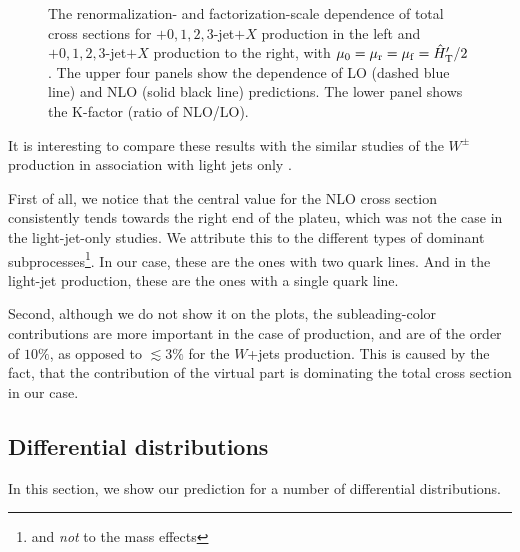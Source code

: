 \begin{figure}[t]
\begin{center}
\end{center}
\caption{The renormalization- and factorization-scale dependence of total cross
  sections for \Wbbm$+0,1,2,3$-jet$+X$ production in the left and
\Wbbp$+0,1,2,3$-jet$+X$ production to the right,
 with $\mu_0=\mu_\mathrm{r}=\mu_\mathrm{f}={\hat H}_{\mathrm T}'/2$. 
The upper four panels show the dependence of LO (dashed blue line) and
  NLO (solid black line) predictions. The lower panel shows
  the K-factor (ratio of NLO/LO).}
\label{fig_Wjets_sdep}
\end{figure}

It is interesting to compare these results with the similar studies of the $W^{\pm}$ production in association with light jets only \cite{BH:W3jPRL,BH:W4j,BH:W5j,Mangano:2016jyj}.

First of all, we notice that the central value for the NLO cross section consistently tends towards the right end of the plateu,
which was not the case in the light-jet-only studies. We attribute this
to the different types of dominant subprocesses\footnote{and \emph{not} to the mass effects}.
In our case, these are the ones with two quark lines.
And in the light-jet production, these are the ones with a single quark line.

Second, although we do not show it on the plots,
the subleading-color contributions are more important in the case of \Wbbn{} production,
and are of the order of $10\%$, as opposed to  $\lesssim 3\%$ for the $W$+jets production.
This is caused by the fact, that the contribution of the virtual part
is dominating the total cross section in our case.

\subsection{Differential distributions}
\label{diffxsw}

In this section, we show our prediction for a number of differential distributions.

